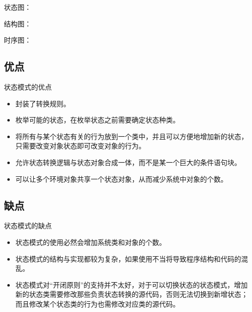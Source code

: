 \documentclass[letterpaper,10pt,english]{sphinxmanual}
\begin{document}
\sphinxAtStartPar
状态图：

\noindent{}

\sphinxAtStartPar
结构图：

\noindent{}

\sphinxAtStartPar
时序图：

\noindent{}


\subsection{优点}
\label{\detokenize{behavioral_patterns/state:id10}}
\sphinxAtStartPar
状态模式的优点
\begin{itemize}
\item {} 
\sphinxAtStartPar
封装了转换规则。

\item {} 
\sphinxAtStartPar
枚举可能的状态，在枚举状态之前需要确定状态种类。

\item {} 
\sphinxAtStartPar
将所有与某个状态有关的行为放到一个类中，并且可以方便地增加新的状态，只需要改变对象状态即可改变对象的行为。

\item {} 
\sphinxAtStartPar
允许状态转换逻辑与状态对象合成一体，而不是某一个巨大的条件语句块。

\item {} 
\sphinxAtStartPar
可以让多个环境对象共享一个状态对象，从而减少系统中对象的个数。

\end{itemize}


\subsection{缺点}
\label{\detokenize{behavioral_patterns/state:id11}}
\sphinxAtStartPar
状态模式的缺点
\begin{itemize}
\item {} 
\sphinxAtStartPar
状态模式的使用必然会增加系统类和对象的个数。

\item {} 
\sphinxAtStartPar
状态模式的结构与实现都较为复杂，如果使用不当将导致程序结构和代码的混乱。

\item {} 
\sphinxAtStartPar
状态模式对“开闭原则”的支持并不太好，对于可以切换状态的状态模式，增加新的状态类需要修改那些负责状态转换的源代码，否则无法切换到新增状态；而且修改某个状态类的行为也需修改对应类的源代码。

\end{itemize}
\end{document}
